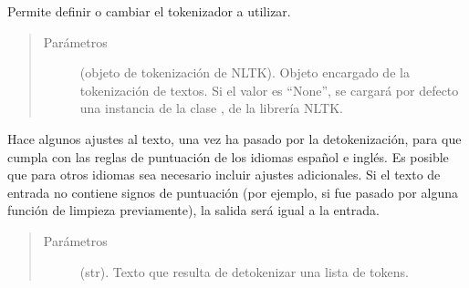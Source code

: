 \documentclass[letterpaper,10pt,openany,spanish]{sphinxmanual}
\begin{document}
\begin{fulllineitems}
\begin{fulllineitems}
\end{fulllineitems}


\begin{fulllineitems}
\label{\detokenize{funciones/utils:utils.tokenizacion.TokenizadorNLTK.establecer_tokenizador}}
Permite definir o cambiar el tokenizador a utilizar.
\begin{quote}\begin{description}
\item[{Parámetros}] \leavevmode
{} \textendash{} (objeto de tokenización de NLTK). Objeto             encargado de la tokenización de textos. Si el valor es “None”, se cargará por             defecto una instancia de la clase , de la librería NLTK.

\end{description}\end{quote}

\end{fulllineitems}


\begin{fulllineitems}
\label{\detokenize{funciones/utils:utils.tokenizacion.TokenizadorNLTK.post_destokenizacion}}
Hace algunos ajustes al texto, una vez ha pasado por la detokenización, para que             cumpla con las reglas de puntuación de los idiomas español e inglés. Es posible             que para otros idiomas sea necesario incluir ajustes adicionales. Si el texto de             entrada no contiene signos de puntuación (por ejemplo, si fue pasado por alguna             función de limpieza previamente), la salida será igual a la entrada.
\begin{quote}\begin{description}
\item[{Parámetros}] \leavevmode
{} \textendash{} (str). Texto que resulta de detokenizar una lista de tokens.


\end{description}
\end{quote}
\end{fulllineitems}
\end{fulllineitems}
\end{document}
